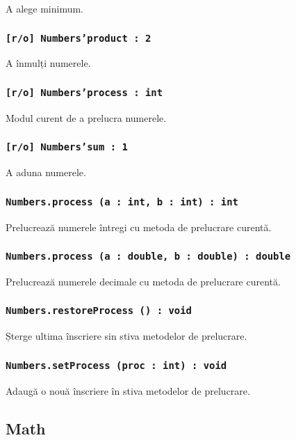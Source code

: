 A alege minimum.

\subsubsection{\texttt{[r/o] Numbers'product : 2}}

A înmulți numerele.

\subsubsection{\texttt{[r/o] Numbers'process : int}}

Modul curent de a prelucra numerele.

\subsubsection{\texttt{[r/o] Numbers'sum : 1}}

A aduna numerele.

\subsubsection{\texttt{Numbers.process (a : int, b : int) : int}}

Prelucrează numerele întregi cu metoda de prelucrare curentă.

\subsubsection{\texttt{Numbers.process (a : double, b : double) : double}}

Prelucrează numerele decimale cu metoda de prelucrare curentă.

\subsubsection{\texttt{Numbers.restoreProcess () : void}}

Șterge ultima înscriere sin stiva metodelor de prelucrare.

\subsubsection{\texttt{Numbers.setProcess (proc : int) : void}}

Adaugă o nouă înscriere în stiva metodelor de prelucrare.

\subsection{{\color{orange} Math}}

